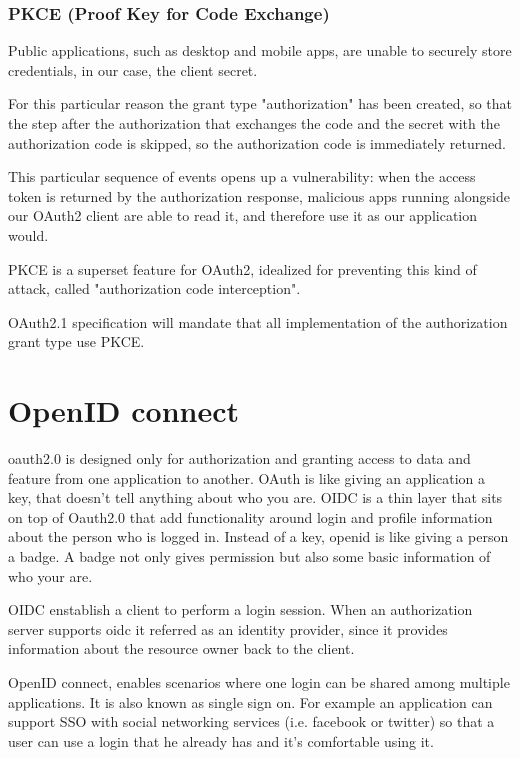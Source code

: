 \documentclass[11pt]{style}
\begin{document}
\subsubsection{PKCE (Proof Key for Code Exchange)}
Public applications, such as desktop and mobile apps, are unable to securely
store credentials, in our case, the client secret.

For this particular reason the grant type "authorization" has been created, so
that the step after the authorization that exchanges the code and the secret
with the authorization code is skipped, so the authorization code is immediately
returned.

This particular sequence of events opens up a vulnerability:
when the access token is returned by the authorization response, malicious apps
running alongside our OAuth2 client are able to read it, and therefore use it as
our application would.

PKCE is a superset feature for OAuth2, idealized for preventing this kind of
attack, called "authorization code interception".

OAuth2.1 specification will mandate that all implementation of the authorization
grant type use PKCE.

\section{OpenID connect}
\label{openid}

oauth2.0 is designed only for authorization and granting access to data and
feature from one application to another.
OAuth is like giving an application a key, that doesn't tell anything about who
you are.
OIDC is a thin layer that sits on top of Oauth2.0 that add functionality around
login and profile information about the person who is logged in.
Instead of a key, openid is like giving a person a badge. A badge not only gives
permission but also some basic information of who your are.

OIDC enstablish a client to perform a login session.
When an authorization server supports oidc it referred as an identity provider,
since it provides information about the resource owner back to the client.

OpenID connect, enables scenarios where one login can be shared among multiple
applications. It is also known as single sign on.
For example an application can support SSO with social networking services (i.e.
facebook or twitter) so that a user can use a login that he already has and it's
comfortable using it.
\end{document}
